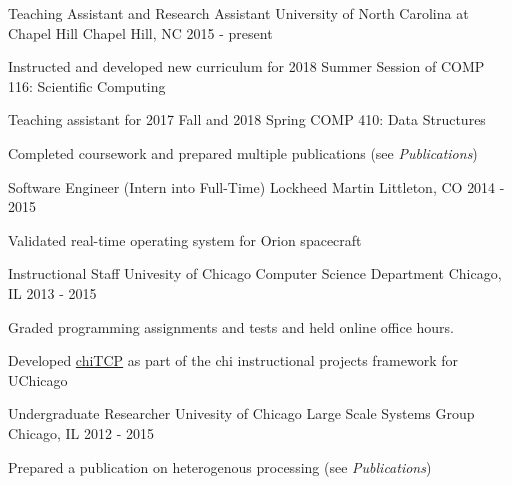 
\begin{cventries}
  \cventry
    {Teaching Assistant and Research Assistant} %
    {University of North Carolina at Chapel Hill} %
    {Chapel Hill, NC} %
    {2015 - present} %
    {
      \begin{cvitems} %
        \item {Instructed and developed new curriculum for 2018 Summer Session of COMP 116:  Scientific Computing}
	\item {Teaching assistant for 2017 Fall and 2018 Spring COMP 410: Data Structures}
	\item {Completed coursework and prepared multiple publications (see \textit{Publications})}
      \end{cvitems}
    }

  \cventry
    {Software Engineer (Intern into Full-Time)} %
    {Lockheed Martin} %
    {Littleton, CO} %
    {2014 - 2015} %
    {
      \begin{cvitems} %
        \item {Validated real-time operating system for Orion spacecraft}
      \end{cvitems}
    }

  \cventry
    {Instructional Staff} %
    {Univesity of Chicago Computer Science Department} %
    {Chicago, IL} %
    {2013 - 2015} %
    {
      \begin{cvitems} %
        \item {Graded programming assignments and tests and held online office hours.}
	\item {Developed \href{https://chi.cs.uchicago.edu/chitcp/index.html}{chiTCP} as part of the chi instructional projects framework for UChicago}
      \end{cvitems}
    }

  \cventry
    {Undergraduate Researcher} %
    {Univesity of Chicago Large Scale Systems Group} %
    {Chicago, IL} %
    {2012 - 2015} %
    {
      \begin{cvitems} %
        \item {Prepared a publication on heterogenous processing (see \textit{Publications})}
      \end{cvitems}
    }


\end{cventries}

